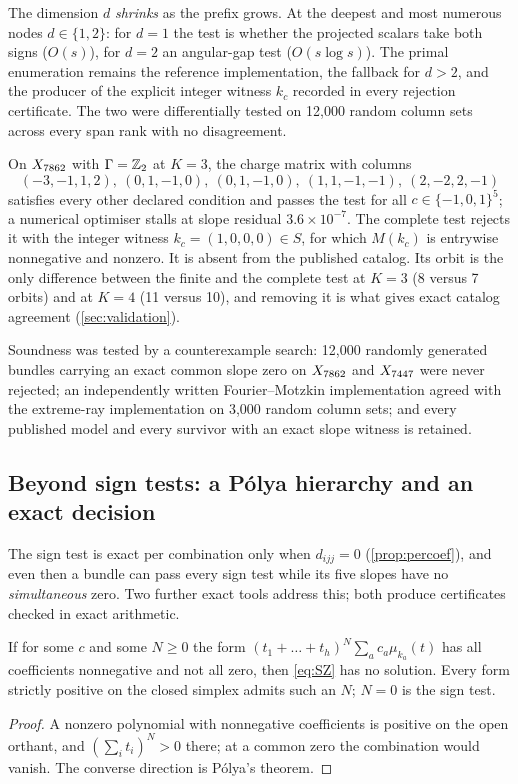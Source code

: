 The dimension $d$ \emph{shrinks} as the prefix grows. At the deepest and most
numerous nodes $d\in\{1,2\}$: for $d=1$ the test is whether the projected
scalars take both signs ($O(s)$), for $d=2$ an angular-gap test
($O(s\log s)$). The primal enumeration remains the reference implementation,
the fallback for $d>2$, and the producer of the explicit integer witness $k_c$
recorded in every rejection certificate. The two were differentially tested on
12,000 random column sets across every span rank with no disagreement.

\begin{example}\label{ex:spurious}
On $X_{7862}$ with $\Gamma=\mathbb{Z}_2$ at $K=3$, the charge matrix with columns
\[
(-3,-1,1,2),\ (0,1,-1,0),\ (0,1,-1,0),\ (1,1,-1,-1),\ (2,-2,2,-1)
\]
satisfies every other declared condition and passes the test for all
$c\in\{-1,0,1\}^5$; a numerical optimiser stalls at slope residual
$3.6\times10^{-7}$. The complete test rejects it with the integer witness
$k_c=(1,0,0,0)\in S$, for which $M(k_c)$ is entrywise nonnegative and nonzero.
It is absent from the published catalog. Its orbit is the only difference
between the finite and the complete test at $K=3$ (8 versus 7 orbits) and at
$K=4$ (11 versus 10), and removing it is what gives exact catalog agreement
(\cref{sec:validation}).
\end{example}

Soundness was tested by a counterexample search: 12,000 randomly generated
bundles carrying an exact common slope zero on $X_{7862}$ and $X_{7447}$ were never
rejected; an independently written Fourier--Motzkin implementation agreed with
the extreme-ray implementation on 3,000 random column sets; and every published
model and every survivor with an exact slope witness is retained.

\subsection{Beyond sign tests: a Pólya hierarchy and an exact decision}
\label{sec:polya}

The sign test is exact per combination only when $d_{ijj}=0$
(\cref{prop:percoef}), and even then a bundle can pass every sign test while its
five slopes have no \emph{simultaneous} zero. Two further exact tools address
this; both produce certificates checked in exact arithmetic.

\begin{proposition}\label{prop:polya}
If for some $c$ and some $N\ge0$ the form
$(t_1+\dots+t_h)^N\sum_ac_a\mu_{k_a}(t)$ has all coefficients nonnegative and not
all zero, then \eqref{eq:SZ} has no solution. Every form strictly positive on the
closed simplex admits such an $N$; $N=0$ is the sign test.
\end{proposition}
\begin{proof}
A nonzero polynomial with nonnegative coefficients is positive on the open
orthant, and $(\sum_it_i)^N>0$ there; at a common zero the combination would
vanish. The converse direction is Pólya's theorem.
\end{proof}

